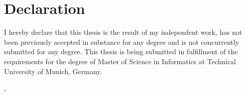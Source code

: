 \thispagestyle{empty}
\noindent
\chapter{Declaration}

I hereby declare that this thesis is the result of my independent work, has not been previously accepted in substance for any degree and is not concurrently submitted for any degree. This thesis is being
submitted in fulfillment of the requirements for the degree of Master of Science in Informatics at Technical University of Munich, Germany.

\vspace{30mm}
\noindent
\getSubmissionLocation{}, \getSubmissionDate{} \hspace{82mm} \getAuthor{}

\cleardoublepage{}
